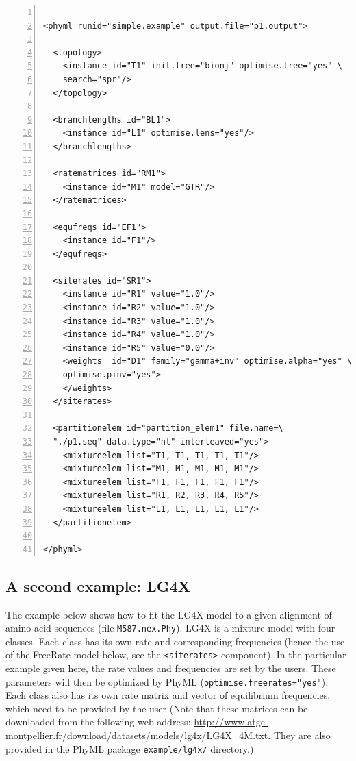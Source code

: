 \documentclass[a4paper,12pt]{article}
\newcommand{\x}[1]{\texttt{#1}}
\begin{document}
\vspace{0.2cm}
\begin{Verbatim}[frame=single, label=Simple PhyML XML example, samepage=true, baselinestretch=0.5,
  fontsize=\small, numbers=left]

<phyml runid="simple.example" output.file="p1.output">

  <topology>
    <instance id="T1" init.tree="bionj" optimise.tree="yes" \
    search="spr"/>
  </topology>

  <branchlengths id="BL1">
    <instance id="L1" optimise.lens="yes"/>
  </branchlengths>

  <ratematrices id="RM1">
    <instance id="M1" model="GTR"/>
  </ratematrices>

  <equfreqs id="EF1">
    <instance id="F1"/>
  </equfreqs>

  <siterates id="SR1">
    <instance id="R1" value="1.0"/>
    <instance id="R2" value="1.0"/>
    <instance id="R3" value="1.0"/>
    <instance id="R4" value="1.0"/>
    <instance id="R5" value="0.0"/>
    <weights  id="D1" family="gamma+inv" optimise.alpha="yes" \
    optimise.pinv="yes">
    </weights>
  </siterates>

  <partitionelem id="partition_elem1" file.name=\
  "./p1.seq" data.type="nt" interleaved="yes">
    <mixtureelem list="T1, T1, T1, T1, T1"/>
    <mixtureelem list="M1, M1, M1, M1, M1"/>
    <mixtureelem list="F1, F1, F1, F1, F1"/>
    <mixtureelem list="R1, R2, R3, R4, R5"/>
    <mixtureelem list="L1, L1, L1, L1, L1"/>
  </partitionelem>

</phyml>

\end{Verbatim}


\subsection{A second example: LG4X}

The example below shows how to fit the LG4X model \cite{lg4x} to a given alignment of amino-acid
sequences (file \x{M587.nex.Phy}). LG4X is a mixture model with four classes. Each class has its own
rate and corresponding frequencies (hence the use of the FreeRate model below, see the
\x{<siterates>} component). In the particular example given here, the rate values and frequencies
are set by the users. These parameters will then be optimized by PhyML (\x{optimise.freerates="yes"}).
Each class also has its own rate matrix and vector of equilibrium frequencies, which need to be provided by
the user (Note that these matrices can be downloaded from the following web address:
\url{http://www.atgc-montpellier.fr/download/datasets/models/lg4x/LG4X_4M.txt}. They are also
provided in the PhyML package \x{example/lg4x/} directory.)
\end{document}
